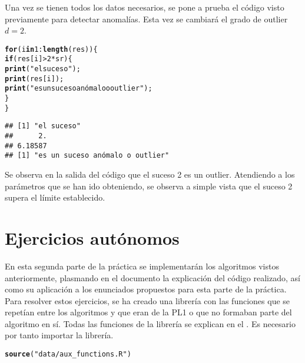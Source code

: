 \documentclass[12pt]{report}\usepackage[]{graphicx}\usepackage[dvipsnames]{xcolor}
\makeatletter
\newcommand{\hlnum}[1]{\textcolor[rgb]{0.686,0.059,0.569}{#1}}%
\newcommand{\hlstr}[1]{\textcolor[rgb]{0.192,0.494,0.8}{#1}}%
\newcommand{\hlopt}[1]{\textcolor[rgb]{0,0,0}{#1}}%
\newcommand{\hlstd}[1]{\textcolor[rgb]{0.345,0.345,0.345}{#1}}%
\newcommand{\hlkwa}[1]{\textcolor[rgb]{0.161,0.373,0.58}{\textbf{#1}}}%
\newcommand{\hlkwd}[1]{\textcolor[rgb]{0.737,0.353,0.396}{\textbf{#1}}}%
\newenvironment{kframe}{%
 \def\at@end@of@kframe{}%
 \ifinner\ifhmode%
  \def\at@end@of@kframe{\end{minipage}}%
  \begin{minipage}{\columnwidth}%
 \fi\fi%
 \def\FrameCommand##1{\hskip\@totalleftmargin \hskip-\fboxsep
 \colorbox{shadecolor}{##1}\hskip-\fboxsep
     \hskip-\linewidth \hskip-\@totalleftmargin \hskip\columnwidth}%
 \MakeFramed {\advance\hsize-\width
   \@totalleftmargin\z@ \linewidth\hsize
   \@setminipage}}%
 {\par\unskip\endMakeFramed%
 \at@end@of@kframe}
\newenvironment{knitrout}{}{} %
\makeatother
\begin{document}
			 Una vez se tienen todos los datos necesarios, se pone a prueba el código visto previamente para detectar anomalías. Esta vez se cambiará el grado de outlier $d = 2$.
			 
\begin{knitrout}
\color{fgcolor}\begin{kframe}
\begin{alltt}
\hlkwa{for} \hlstd{(i} \hlkwa{in} \hlnum{1}\hlopt{:}\hlkwd{length}\hlstd{(res))\{}
        \hlkwa{if}\hlstd{(res[i]}\hlopt{>}\hlnum{2}\hlopt{*}\hlstd{sr)\{}
                \hlkwd{print}\hlstd{(}\hlstr{"el suceso"}\hlstd{);}
                \hlkwd{print}\hlstd{(res[i]);}
                \hlkwd{print}\hlstd{(}\hlstr{"es un suceso anómalo o outlier"}\hlstd{);}
                                 \hlstd{\}}
\hlstd{\}}
\end{alltt}
\begin{verbatim}
## [1] "el suceso"
##      2. 
## 6.18587 
## [1] "es un suceso anómalo o outlier"
\end{verbatim}
\end{kframe}
\end{knitrout}
			 
			 Se observa en la salida del código que el suceso 2 es un outlier. Atendiendo a los parámetros que se han ido obteniendo, se observa a simple vista que el suceso 2 supera el límite establecido. 
	 
	 \chapter{Ejercicios autónomos}
	 
		 En esta segunda parte de la práctica se implementarán los algoritmos vistos anteriormente, plasmando en el documento la explicación del código realizado, así como su aplicación a los enunciados propuestos para esta parte de la práctica. Para resolver estos ejercicios, se ha creado una librería con las funciones que se repetían entre los algoritmos y que eran de la PL1 o que no formaban parte del algoritmo en sí. Todas las funciones de la librería se explican en el . Es necesario por tanto importar la librería.
		 
\begin{knitrout}
\color{fgcolor}\begin{kframe}
\begin{alltt}
\hlkwd{source}\hlstd{(}\hlstr{"data/aux_functions.R"}\hlstd{)}
\end{alltt}
\end{kframe}
\end{knitrout}
		 
\end{document}
